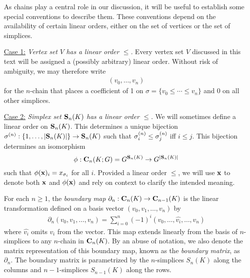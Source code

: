 \DIFdelend \begin{remark}
\label{rmk:indexingchains}
As chains play a central role in our discussion, it will be useful to establish some special conventions to describe them.  These conventions depend on the availability of certain linear orders, either on the set of vertices or the set of simplices.

\noindent \underline{Case 1:} \emph{Vertex set $V$ has a linear order $\le$. }  Every vertex set $V$ discussed in this text will be assigned a (possibly arbitrary) linear order.  Without  risk of ambiguity, we may therefore write
    \begin{align*}
        (v_0, \ldots, v_n)
    \end{align*}
for the $n$-chain that places a coefficient of 1 on $\sigma = \{v_0 \leq \cdots \leq v_n\}$ and 0 on all other simplices. 

\noindent \underline{Case 2:} \emph{Simplex set $\mathbf{S}_n(K)$ has a linear order $\le$.}  We will sometimes define a linear order on $\mathbf{S}_n(K)$.  This determines a unique bijection  $\sigma ^{(n)}: \{1, \ldots, |\mathbf{S}_n(K)|\} \to  \mathbf{S}_n(K)$ such that $\sigma_i^{(n)} \le \sigma_j^{(n)}$ iff $i \le j$.  This bijection determines an isomorphism
    $$
        \phi: 
        \mathbf{C}_n(K;G) = G^{\mathbf{S}_n(K)}
        \to
        G^{|\mathbf{S}_n(K)|}
    $$
such that $\phi(\mathbf{x})_i = x_{\sigma_i}$ for all $i$.  
Provided a linear order $\le$,  we will use $\mathbf{x}$ to denote both $\mathbf{x}$ and $\phi(\mathbf{x})$ and rely on context to clarify the  intended meaning.
\end{remark}


  

For each $n\geq 1$, the \textit{boundary map} $\partial_n: \mathbf{C}_n(K) \rightarrow \mathbf{C}_{n-1}(K)$ is the linear transformation defined on a basis vector  $(v_0, v_1, \ldots, v_n)$ by 
    \begin{align*}
    \textstyle
        \partial_n(v_0, v_1, \ldots, v_n) = \sum_{i=0}^n (-1)^i (v_0, \ldots, \hat{v_i}, \ldots, v_n)
    \end{align*}
where $\hat{v_i}$ omits $v_i$ from the vector. This map extends linearly from the basis of $n$-simplices to any $n$-chain in $\mathbf{C}_n(K)$. By an abuse of notation, we also denote the matrix representation of this boundary map, known as the \textit{boundary matrix}, as $\partial_n$. The boundary matrix is parametrized by the $n$-simplices $S_n(K)$ along the columns and $n-1$-simplices $S_{n-1}(K)$ along the rows. 


